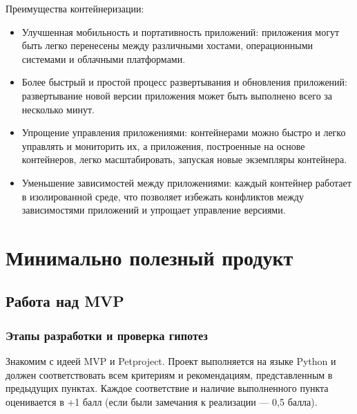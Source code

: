 \documentclass[letterpaper,10pt,russian]{sphinxmanual}
\begin{document}
\sphinxAtStartPar
Преимущества контейнеризации:
\begin{itemize}
\item {} 
\sphinxAtStartPar
Улучшенная мобильность и портативность приложений: приложения могут быть легко перенесены между различными хостами, операционными системами и облачными платформами.

\item {} 
\sphinxAtStartPar
Более быстрый и простой процесс развертывания и обновления приложений: развертывание новой версии приложения может быть выполнено всего за несколько минут.

\item {} 
\sphinxAtStartPar
Упрощение управления приложениями: контейнерами можно быстро и легко управлять и мониторить их, а приложения, построенные на основе контейнеров, легко масштабировать, запуская новые экземпляры контейнера.

\item {} 
\sphinxAtStartPar
Уменьшение зависимостей между приложениями: каждый контейнер работает в изолированной среде, что позволяет избежать конфликтов между зависимостями приложений и упрощает управление версиями.

\end{itemize}


\chapter{Минимально полезный продукт}
\label{\detokenize{index:id9}}
\sphinxstepscope


\section{Работа над MVP}
\label{\detokenize{educational_materials/mvp/content:mvp}}\label{\detokenize{educational_materials/mvp/content::doc}}

\subsection{Этапы разработки и проверка гипотез}
\label{\detokenize{educational_materials/mvp/content:id1}}
\sphinxAtStartPar
Знакомим с идеей MVP и Pet\sphinxhyphen{}project. Проект выполняется на языке Python и должен соответствовать всем критериям и рекомендациям, представленным в предыдущих пунктах. Каждое соответствие и наличие выполненного пункта оценивается в +1 балл (если были замечания к реализации — 0,5 балла).
\end{document}
